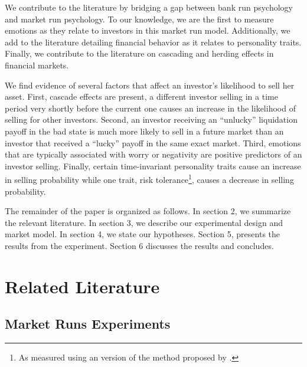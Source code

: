 \documentclass[11pt]{article}
\begin{document}
We contribute to the literature by bridging a gap between bank run psychology and market run psychology. To our knowledge, we are the first to measure emotions as they relate to investors in this market run model. Additionally, we add to the literature detailing financial behavior as it relates to personality traits. Finally, we contribute to the literature on cascading and herding effects in financial markets. 

We find evidence of several factors that affect an investor's likelihood to sell her asset. First, cascade effects are present, a different investor selling in a time period very shortly before the current one causes an increase in the likelihood of selling for other investors. Second, an investor receiving an ``unlucky'' liquidation payoff in the bad state is much more likely to sell in a future market than an investor that received a ``lucky'' payoff in the same exact market. Third, emotions that are typically associated with worry or negativity are positive predictors of an investor selling. Finally, certain time-invariant personality traits cause an increase in selling probability while one trait, risk tolerance\footnote{As measured using an version of the method proposed by \cite{gneezy1997experiment}.}, causes a decrease in selling probability.

The remainder of the paper is organized as follows. In section 2, we summarize the relevant literature. In section 3, we describe our experimental design and market model. In section 4, we state our hypotheses. Section 5, presents the results from the experiment. Section 6 discusses the results and concludes. 

\section{Related Literature}

\subsection{Market Runs Experiments}
\end{document}
